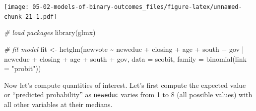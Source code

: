 \documentclass[
]{book}
\newenvironment{Shaded}{\begin{snugshade}}{\end{snugshade}}
\newcommand{\AttributeTok}[1]{\textcolor[rgb]{0.77,0.63,0.00}{#1}}
\newcommand{\CommentTok}[1]{\textcolor[rgb]{0.56,0.35,0.01}{\textit{#1}}}
\newcommand{\FunctionTok}[1]{\textcolor[rgb]{0.00,0.00,0.00}{#1}}
\newcommand{\NormalTok}[1]{#1}
\newcommand{\OtherTok}[1]{\textcolor[rgb]{0.56,0.35,0.01}{#1}}
\newcommand{\SpecialCharTok}[1]{\textcolor[rgb]{0.00,0.00,0.00}{#1}}
\newcommand{\StringTok}[1]{\textcolor[rgb]{0.31,0.60,0.02}{#1}}
\begin{document}
\texttt{[image: 05-02-models-of-binary-outcomes\_files/figure-latex/unnamed-chunk-21-1.pdf]}

\begin{Shaded}
\begin{Highlighting}[]
\CommentTok{\# load packages}
\FunctionTok{library}\NormalTok{(glmx)}

\CommentTok{\# fit model}
\NormalTok{fit }\OtherTok{\textless{}{-}} \FunctionTok{hetglm}\NormalTok{(newvote }\SpecialCharTok{\textasciitilde{}}\NormalTok{ neweduc }\SpecialCharTok{+}\NormalTok{ closing }\SpecialCharTok{+}\NormalTok{ age }\SpecialCharTok{+}\NormalTok{ south }\SpecialCharTok{+}\NormalTok{ gov }\SpecialCharTok{|}\NormalTok{ neweduc }\SpecialCharTok{+}\NormalTok{ closing }\SpecialCharTok{+}\NormalTok{ age }\SpecialCharTok{+}\NormalTok{ south }\SpecialCharTok{+}\NormalTok{ gov, }
              \AttributeTok{data =}\NormalTok{ scobit, }\AttributeTok{family =} \FunctionTok{binomial}\NormalTok{(}\AttributeTok{link =} \StringTok{"probit"}\NormalTok{))}
\end{Highlighting}
\end{Shaded}

Now let's compute quantities of interest. Let's first compute the expected value or ``predicted probability'' as \texttt{neweduc} varies from 1 to 8 (all possible values) with all other variables at their medians.
\end{document}
